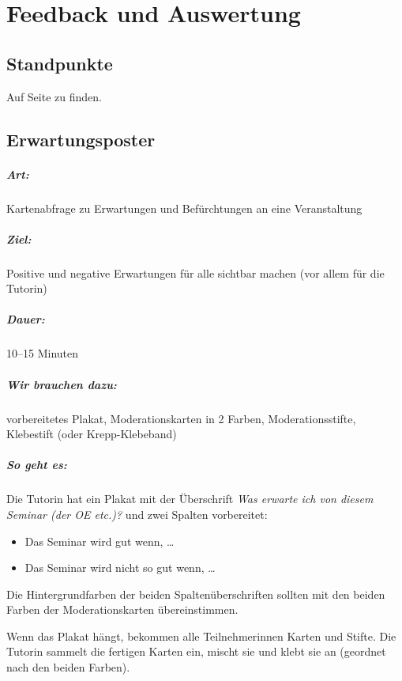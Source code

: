 \chapter{Feedback und Auswertung}

\section{Standpunkte}
Auf Seite \pageref{standpunkte} zu finden.

\section{Erwartungsposter}
\paragraph{Art:} Kartenabfrage zu Erwartungen und Befürchtungen an eine Veranstaltung
\paragraph{Ziel:} Positive und negative Erwartungen für alle sichtbar machen (vor allem für die Tutorin)
\paragraph{Dauer:} 10--15 Minuten
\paragraph{Wir brauchen dazu:} vorbereitetes Plakat, Moderationskarten in 2 Farben, Moderationsstifte, Klebestift (oder Krepp-Klebeband)
\paragraph{So geht es:} Die Tutorin hat ein Plakat mit der Überschrift \textit{Was erwarte ich von diesem Seminar (der OE etc.)?} und zwei Spalten vorbereitet:
\begin{itemize}
\item Das Seminar wird gut wenn, \ldots
\item Das Seminar wird nicht so gut wenn, \ldots
\end{itemize}
Die Hintergrundfarben der beiden Spaltenüberschriften sollten mit den beiden Farben der Moderationskarten übereinstimmen.

Wenn das Plakat hängt, bekommen alle Teilnehmerinnen Karten und Stifte. Die Tutorin sammelt die fertigen Karten ein, mischt sie und klebt sie an (geordnet nach den beiden Farben).
